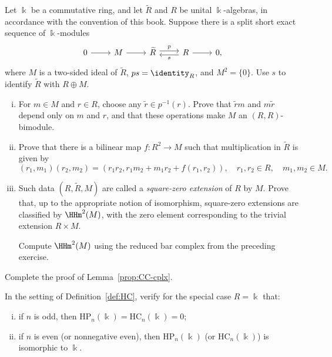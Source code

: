 \begin{Exercises}
	\item Let $\Bbbk$ be a commutative ring, and let $\widetilde R$ and $R$
	be unital $\Bbbk$-algebras, in accordance with the convention of this
	book. Suppose there is a split short exact sequence of $\Bbbk$-modules
	\[
	\begin{tikzcd}
		0 \arrow[r] & M \arrow[r] & \widetilde R
		\arrow[shift left, r, "p"] &
		R \arrow[r] \arrow[shift left, l, "s"] & 0,
	\end{tikzcd}
	\]
	where $M$ is a two-sided ideal of $\widetilde R$, $ps=\identity_R$, and
	$M^2=\{0\}$. Use $s$ to identify $\widetilde R$ with $R\oplus M$.
	\begin{enumerate}[(i)]
		\item For $m\in M$ and $r\in R$, choose any
		$\widetilde r\in p^{-1}(r)$. Prove that $\widetilde rm$ and
		$m\widetilde r$ depend only on $m$ and $r$, and that these operations
		make $M$ an $(R,R)$-bimodule.
		\item Prove that there is a bilinear map $f:R^2\to M$ such that
		multiplication in $\widetilde R$ is given by
		\[
			(r_1,m_1)(r_2,m_2)
			=(r_1r_2,r_1m_2+m_1r_2+f(r_1,r_2)),
			\quad r_1,r_2\in R,\quad m_1,m_2\in M.
		\]
		\item Such data $(R,\widetilde R,M)$ are called a
		\emph{square-zero extension} of $R$ by $M$. Prove that, up to the
		appropriate notion of isomorphism, square-zero extensions are
		classified by $\HHm^2(M)$, with the zero element corresponding to the
		trivial extension $R\times M$.
		\begin{hint}
			Compute $\HHm^2(M)$ using the reduced bar complex from the preceding
			exercise.
		\end{hint}
	\end{enumerate}

	\item Complete the proof of Lemma~\ref{prop:CC-cplx}.

	\item In the setting of Definition~\ref{def:HC}, verify for the special
	case $R=\Bbbk$ that:
	\begin{enumerate}[(i)]
		\item if $n$ is odd, then
		$\mathrm{HP}_n(\Bbbk)=\mathrm{HC}_n(\Bbbk)=0$;
		\item if $n$ is even (or nonnegative even), then
		$\mathrm{HP}_n(\Bbbk)$ (or $\mathrm{HC}_n(\Bbbk)$) is isomorphic to
		$\Bbbk$.
	\end{enumerate}


\end{Exercises}
